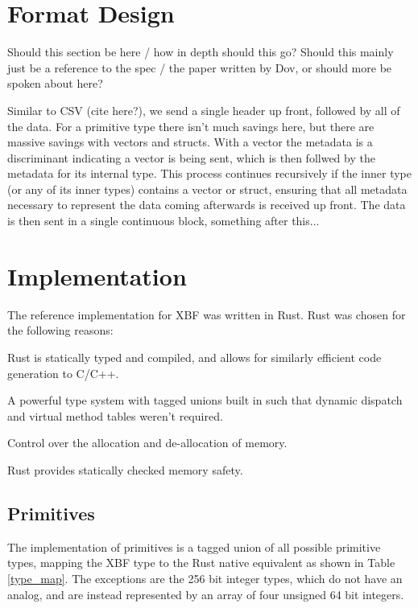\documentclass[conference]{IEEEtran}
\begin{document}
\section{Format Design}

Should this section be here / how in depth should this go? Should this mainly just be a reference to the spec / the paper written by Dov, or should more be spoken about here?

Similar to CSV (cite here?), we send a single header up front, followed by all of the data. For a primitive type there isn't much savings here, but there are massive savings with vectors and structs. With a vector the metadata is a discriminant indicating a vector is being sent, which is then follwed by the metadata for its internal type. This process continues recursively if the inner type (or any of its inner types) contains a vector or struct, ensuring that all metadata necessary to represent the data coming afterwards is received up front. The data is then sent in a single continuous block, something after this...

\section{Implementation}

The reference implementation for XBF\cite{xbf_impl} was written in Rust. Rust was chosen for the following reasons:
\begin{IEEEitemize}
	\item Rust is statically typed and compiled, and allows for similarly efficient code generation to C/C++.
	\item A powerful type system with tagged unions built in such that dynamic dispatch and virtual method tables weren't required.
	\item Control over the allocation and de-allocation of memory.
	\item Rust provides statically checked memory safety.
\end{IEEEitemize}

\subsection{Primitives}

The implementation of primitives is a tagged union of all possible primitive types, mapping the XBF type to the Rust native equivalent as shown in Table \ref{type_map}. The exceptions are the 256 bit integer types, which do not have an analog, and are instead represented by an array of four unsigned 64 bit integers.
\end{document}
